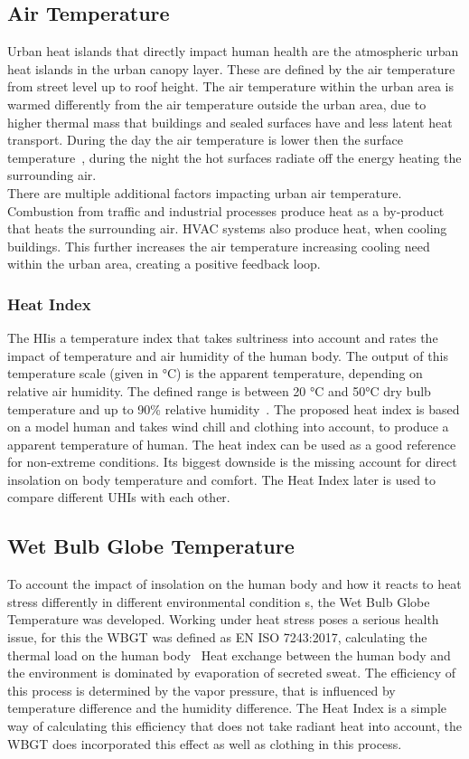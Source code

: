 \documentclass[12pt,a4paper, english,twoside]{article}
\begin{document}
  \subsection{Air Temperature}\label{ssec:airtemperature}
    Urban heat islands that directly impact human health are the atmospheric urban heat islands in the urban canopy layer. 
    These are defined by the air temperature from street level up to roof height. 
    The air temperature within the urban area is warmed differently from the air temperature outside the urban area, due to higher thermal mass that buildings and sealed surfaces have and less latent heat transport.
    During the day the air temperature is lower then the surface temperature~\cite{EPA2008}, during the night the hot surfaces radiate off the energy heating the surrounding air.\\
    There are multiple additional factors impacting urban air temperature. 
    Combustion from traffic and industrial processes produce heat as a by-product that heats the surrounding air. 
    HVAC systems also produce heat, when cooling buildings. 
    This further increases the air temperature increasing cooling need within the urban area, creating a positive feedback loop. 
    \newpage
    \subsubsection{Heat Index}
    The \gls{HI}is a temperature index that takes sultriness into account and rates the impact of temperature and air humidity of the human body. 
    The output of this temperature scale (given in °C) is the apparent temperature, depending on relative air humidity. 
    The defined range is between 20 °C and 50°C dry bulb temperature and up to 90\% relative humidity~\cite[p. 862]{Steadman1979}. 
    The proposed heat index is based on a model human and takes wind chill and clothing into account, to produce a apparent temperature of human. 
    The heat index can be used as a good reference for non-extreme conditions. 
    Its biggest downside is the missing account for direct insolation on body temperature and comfort.
    The Heat Index later is used to compare different \glspl{UHI} with each other.
  \subsection{Wet Bulb Globe Temperature}
    To account the impact of insolation on the human body and how it reacts to heat stress differently in different environmental condition s, the Wet Bulb Globe Temperature was developed. 
    Working under heat stress poses a serious health issue, for this the \gls{WBGT} was defined as EN ISO 7243:2017, calculating the thermal load on the human body~\cite{Iso7243_2017}
    Heat exchange between the human body and the environment is dominated by evaporation of secreted sweat.
    The efficiency of this process is determined by the vapor pressure, that is influenced by temperature difference and the humidity difference. %
    The Heat Index is a simple way of calculating this efficiency that does not take radiant heat into account, the WBGT does incorporated this effect as well as clothing in this process. 
\end{document}
